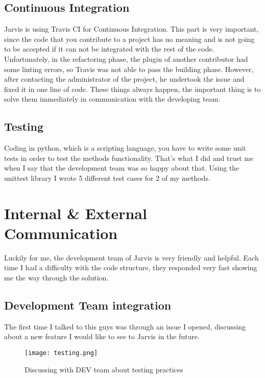 \documentclass[12pt]{article}
\begin{document}
  \subsection{Continuous Integration}
    
    Jarvis is using Travis CI for Continuous Integration. This part is very important, since the code that you contribute to a project has no meaning and is not going to be accepted if it can not be integrated with the rest of the code. Unfortunately, in the refactoring phase, the plugin of another contributor had some linting errors, so Travis was not able to pass the building phase. However, after contacting the administrator of the project, he undertook the issue and fixed it in one line of code. These things always happen, the important thing is to solve them immediately in communication with the developing team.
      
  \subsection{Testing}
  
    Coding in python, which is a scripting language, you have to write some unit tests in order to test the methods functionality. That's what I did and trust me when I say that the development team was so happy about that. Using the unittest library I wrote 5 different test cases for 2 of my methods.
  
\section{Internal \& External Communication}

    Luckily for me, the development team of Jarvis is very friendly and helpful. Each time I had a difficulty with the code structure, they responded very fast showing me the way through the solution.
 
  \subsection{Development Team integration}
  
    The first time I talked to this guys was through an issue I opened, discussing about a new feature I would like to see to Jarvis in the future.
    
\begin{figure}[tph!]
\centerline{\texttt{[image: testing.png]}}
  \caption{Discussing with DEV team about testing practices}
  \label{fig:verticalcell}
\end{figure}
  
\end{document}
